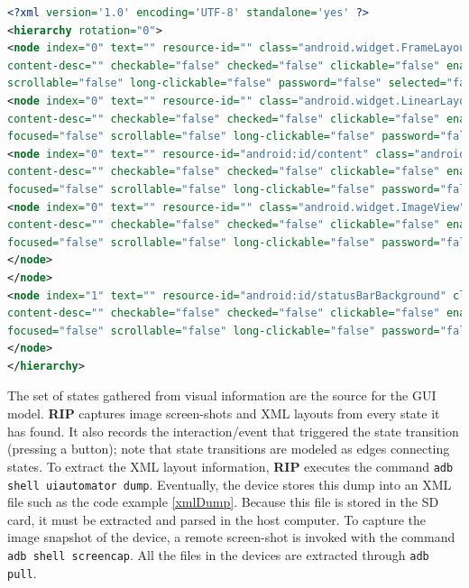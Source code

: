 \begin{lstlisting}[language=xml, caption={XML dump from an app, containing the layout hierarchy},label={xmlDump}]
<?xml version='1.0' encoding='UTF-8' standalone='yes' ?>
<hierarchy rotation="0">
<node index="0" text="" resource-id="" class="android.widget.FrameLayout" package="com.clockwork.mcdonalds"
content-desc="" checkable="false" checked="false" clickable="false" enabled="true" focusable="false" focused="false"
scrollable="false" long-clickable="false" password="false" selected="false" bounds="[0,0][1080,1794]">
<node index="0" text="" resource-id="" class="android.widget.LinearLayout" package="com.clockwork.mcdonalds"
content-desc="" checkable="false" checked="false" clickable="false" enabled="true" focusable="false"
focused="false" scrollable="false" long-clickable="false" password="false" selected="false" bounds="[0,0][1080,1794]">
<node index="0" text="" resource-id="android:id/content" class="android.widget.FrameLayout" package="com.clockwork.mcdonalds"
content-desc="" checkable="false" checked="false" clickable="false" enabled="true" focusable="false"
focused="false" scrollable="false" long-clickable="false" password="false" selected="false" bounds="[0,63][1080,1794]">
<node index="0" text="" resource-id="" class="android.widget.ImageView" package="com.clockwork.mcdonalds"
content-desc="" checkable="false" checked="false" clickable="false" enabled="true" focusable="false"
focused="false" scrollable="false" long-clickable="false" password="false" selected="false" bounds="[0,63][1080,1794]" />
</node>
</node>
<node index="1" text="" resource-id="android:id/statusBarBackground" class="android.view.View" package="com.clockwork.mcdonalds"
content-desc="" checkable="false" checked="false" clickable="false" enabled="true" focusable="false"
focused="false" scrollable="false" long-clickable="false" password="false" selected="false" bounds="[0,0][1080,63]" />
</node>
</hierarchy>
\end{lstlisting}


The set of states gathered from visual information are the source for the GUI model. \textbf{RIP} captures image screen-shots and  XML layouts from every state it has found. It also records the interaction/event that triggered the state transition (\eg pressing a button); note that state transitions are modeled as edges connecting states. To extract the XML layout information, \textbf{RIP} executes the command \verb|adb shell uiautomator dump|. Eventually, the device stores this dump into an XML file such as the code example \ref{xmlDump}. Because this file is stored in the SD card, it must be extracted and parsed in the host computer. To capture the image snapshot of the device, a remote screen-shot is invoked with the command \verb|adb shell screencap|. All the files in the devices are extracted through \verb|adb pull|.

